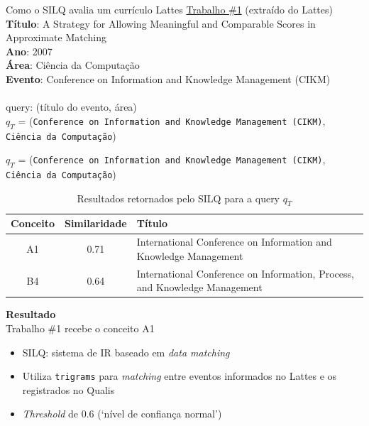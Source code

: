 \documentclass{beamer}
\begin{document}
\begin{frame}{Como o SILQ avalia um currículo Lattes}
  \underline{Trabalho \#1} (extraído do Lattes)\\
  \textbf{Título}: A Strategy for Allowing Meaningful and Comparable Scores in Approximate Matching\\
  \textbf{Ano}: 2007\\
  \textbf{Área}: Ciência da Computação\\
  \textbf{Evento}: Conference on Information and Knowledge Management (CIKM)\\

  \pause
  \hfill \\
  query: (título do evento, área)\\
  $q_T$ = (\texttt{Conference on Information and Knowledge Management (CIKM)}, \texttt{Ciência da Computação})
\end{frame}

\begin{frame}
  $q_T$ = (\texttt{Conference on Information and Knowledge Management (CIKM)}, \texttt{Ciência da Computação})

  \pause
  \footnotesize
  \begin{table}
    \begin{tabular}{ c | c | p{6.5cm} }
      \textbf{Conceito} & \textbf{Similaridade} & \textbf{Título}\\
      \hline \hline

      A1 & 0.71 & International Conference on Information and Knowledge Management\\ \hline
      B4 & 0.64 & International Conference on Information, Process, and Knowledge Management\\
    \end{tabular}
    \caption{Resultados retornados pelo SILQ para a query $q_T$}
  \end{table}

  \pause
  \normalsize
  \textbf{Resultado}\\
  Trabalho \#1 recebe o conceito A1
\end{frame}

\begin{frame}
  \begin{itemize}
    \item SILQ: sistema de IR baseado em \textit{data matching}
    \item Utiliza \texttt{trigrams} para \textit{matching} entre eventos informados no Lattes e os registrados no Qualis
    \item \textit{Threshold} de 0.6 (`nível de confiança normal')
  \end{itemize}
\end{frame}
\end{document}
